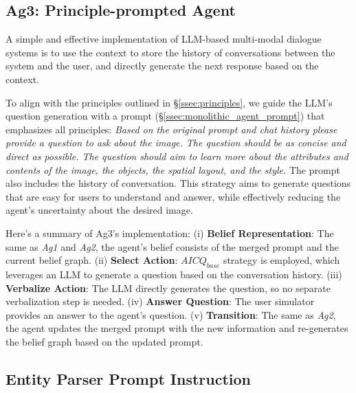 \subsection{Ag3: Principle-prompted Agent}\label{ssec:ag3}
A simple and effective implementation of LLM-based multi-modal dialogue systems is to use the context to store the history of conversations between the system and the user, and directly generate the next response based on the context. %



To align with the principles outlined in \S\ref{ssec:principles}, we guide the LLM's question generation with a prompt (\S\ref{ssec:monolithic_agent_prompt}) that emphasizes all principles: \textit{Based on the original prompt and chat history please provide a question to ask about the image. The question should be as concise and direct as possible. The question should aim to learn more about the attributes and contents of the image, the objects, the spatial layout, and the style.} The prompt also includes the history of conversation. This strategy aims to generate questions that are easy for users to understand and answer, while effectively reducing the agent's uncertainty about the desired image.   

Here's a summary of Ag3's implementation: (i) \textbf{Belief Representation}: The same as \textit{Ag1} and \textit{Ag2}, the agent's belief consists of the merged prompt and the current belief graph. (ii) \textbf{Select Action}: $AICQ_{base}$ strategy is employed, which leverages an LLM to generate a question based on the conversation history. (iii) \textbf{Verbalize Action}: The LLM directly generates the question, so no separate verbalization step is needed. (iv) \textbf{Answer Question}: The user simulator provides an answer to the agent's question. (v) \textbf{Transition}: The same as \textit{Ag2}, the agent updates the merged prompt with the new information and re-generates the belief graph based on the updated prompt.


\subsection{Entity Parser Prompt Instruction} \label{ssec:entity_parser}




